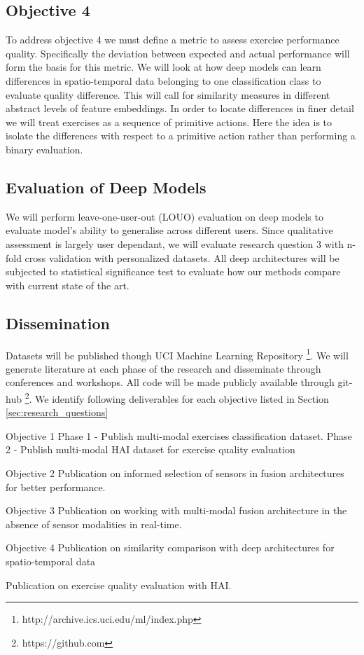 \subsection{Objective 4}
To address objective 4 we must define a metric to assess exercise performance quality.
Specifically the deviation between expected and actual performance will form the basis for this metric.
We will look at how deep models can learn differences in spatio-temporal data belonging to one classification class to evaluate quality difference. This will call for similarity measures in different abstract levels of feature embeddings. In order to locate differences in finer detail we will treat exercises as a sequence of primitive actions. Here the idea is to isolate the differences with respect to a primitive action rather than performing a binary evaluation. 

\subsection{Evaluation of Deep Models}
We will perform leave-one-user-out (LOUO) evaluation on deep models to evaluate model's ability to generalise across different users. Since qualitative assessment is largely user dependant, we will evaluate research question 3 with n-fold cross validation with personalized datasets. All deep architectures will be subjected to statistical significance test to evaluate how our methods compare with current state of the art.

\subsection{Dissemination}
Datasets will be published though UCI Machine Learning Repository \footnote{http://archive.ics.uci.edu/ml/index.php}. We will generate literature at each phase of the research and disseminate through conferences and workshops. All code will be made publicly available through git-hub \footnote{https://github.com}. We identify following deliverables for each objective listed in Section \ref{sec:research_questions}

\begin{outline}
\1 Objective 1 
\2 Phase 1 - Publish multi-modal exercises classification dataset.
\2 Phase 2 - Publish multi-modal HAI dataset for exercise quality evaluation 

\1 Objective 2 
\2 Publication on informed selection of sensors in fusion architectures for better performance.

\1 Objective 3 
\2 Publication on working with multi-modal fusion architecture in the absence of sensor modalities in real-time.

\1 Objective 4
\2 Publication on similarity comparison with deep architectures for spatio-temporal data

\2 Publication on exercise quality evaluation with HAI. 

\end{outline}